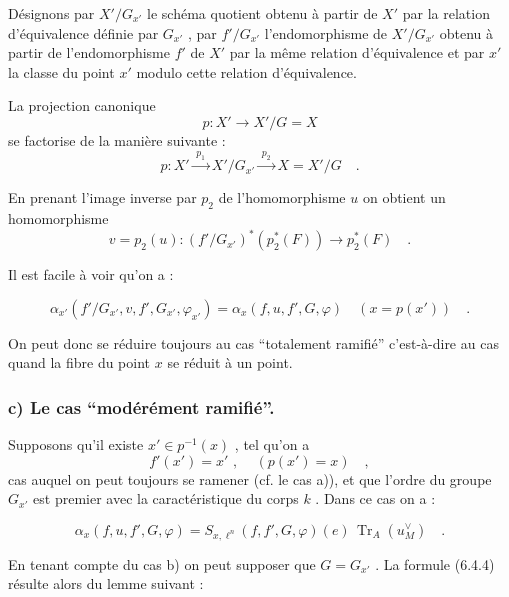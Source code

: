\documentclass[11pt]{article}
\providecommand{\Tr}{\operatorname{Tr}}
\providecommand{\Tr}{\operatorname{Tr}}
\providecommand{\Tr}{\operatorname{Tr}}
\providecommand{\Tr}{\operatorname{Tr}}
\providecommand{\Tr}{\operatorname{Tr}}
\begin{document}
Désignons par $X'/G_{x'}$ le schéma quotient obtenu à partir de $X'$ par la relation d'équivalence définie par $G_{x'}$ , par $f'/G_{x'}$ l'endomorphisme de $X'/G_{x'}$ obtenu à partir de l'endomorphisme $f'$ de $X'$ par la même relation d'équivalence et par $x'$ la classe du point $x'$ modulo cette relation d'équivalence.%

La
projection canonique
\[
p : X' \longrightarrow X'/G = X
\]
se factorise de la manière suivante :
\[
p : X' \xrightarrow{\;p_1\;} X'/G_{x'} \xrightarrow{\;p_2\;} X = X'/G \quad .
\]

En prenant l'image inverse par $p_2$ de l'homomorphisme $u$ on obtient un homomorphisme
\[
v = p_2(u) : (f'/G_{x'})^*(p_2^*(F)) \longrightarrow p_2^*(F) \quad .
\]

Il est facile à voir qu'on a :

\begin{equation}\tag{6.4.3}
\alpha_{x'}(f'/G_{x'}, v, f', G_{x'}, \varphi_{x'}) = \alpha_x(f,u, f', G, \varphi) \quad (x = p(x')) \quad .
\end{equation}

On peut donc se réduire toujours au cas ``totalement ramifié'' c'est-à-dire au cas quand la fibre du point $x$ se réduit à un point.

\subsubsection*{c) Le cas ``modérément ramifié''.} Supposons qu'il existe $x' \in p^{-1}(x)$ , tel qu'on a
\[
f'(x') = x' \text{ , } \quad (p(x') = x) \quad ,
\]
cas auquel on peut toujours se ramener (cf. le cas a)), et que l'ordre du groupe $G_{x'}$ est premier avec la caractéristique du corps $k$ . Dans ce cas on a :

\begin{equation}\tag{6.4.4}
\alpha_x(f,u, f', G, \varphi) = S_{x,\ell^n}(f, f', G, \varphi)(e) \, \Tr_A(u_M^\vee) \quad .
\end{equation}

En tenant compte du cas b) on peut supposer que $G = G_{x'}$ . La formule (6.4.4) résulte alors du lemme suivant :

\end{document}
